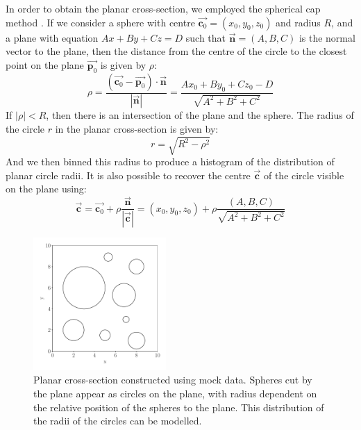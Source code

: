 \documentclass[journal]{IEEEtran}
\begin{document}
In order to obtain the planar cross-section, we employed the spherical cap
method \cite{Sykes1922}. If we consider a sphere with centre
$\overrightarrow{\textbf{c}_0} = (x_0, y_0, z_0)$ and radius $R$, and a plane
with equation $Ax + By + Cz = D$ such that $\overrightarrow{\textbf{n}} = (A, B,
C)$ is the normal vector to the plane, then the distance from the centre of the
circle to the closest point on the plane $\overrightarrow{\textbf{p}_0}$ is given by $\rho$:
\begin{equation*}
\rho = \frac{(\overrightarrow{\textbf{c}_0} - \overrightarrow{\textbf{p}_0}) \cdot{}
  \overrightarrow{\textbf{n}}}{|\overrightarrow{\textbf{n}}|} = \frac{Ax_0 +
  By_0 + Cz_0 - D}{\sqrt{A^2 + B^2 + C^2}}
\end{equation*}
If $|\rho| < R$, then there is an intersection of the plane and the sphere. The
radius of the circle $r$ in the planar cross-section is given by:
\begin{equation*}
r = \sqrt{R^2 - \rho^2}
\end{equation*}
And we then binned this radius to produce a histogram of the distribution of
planar circle radii. It is also possible to recover the centre
$\overrightarrow{\textbf{c}}$ of the circle visible on the plane using:
\begin{equation*}
\overrightarrow{\textbf{c}} = \overrightarrow{\textbf{c}_0} +
\rho\frac{\overrightarrow{\textbf{n}}}{|\overrightarrow{\textbf{c}}|} = (x_0,
y_0, z_0) + \rho\frac{(A, B, C)}{\sqrt{A^2 + B^2 + C^2}}
\end{equation*}

\begin{figure}%
\begin{center}
\includegraphics[width=0.45\textwidth]{./../Figures/circles.pdf}
\caption{Planar cross-section constructed using mock data. Spheres cut by the
  plane appear as circles on the plane, with radius dependent on the relative
  position of the spheres to the plane. This distribution of the radii of the
  circles can be modelled.}\label{fig:circles}
\end{center}
\end{figure}
\end{document}
